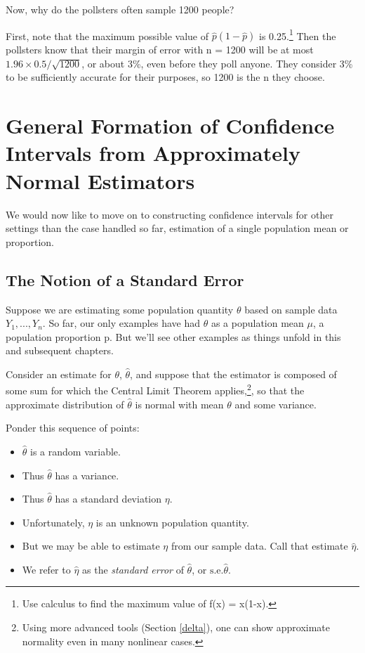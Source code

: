 Now, why do the pollsters often sample 1200 people?  

First, note that the maximum possible value of $\widehat{p}
(1-\widehat{p})$ is 0.25.\footnote{Use calculus to find the maximum
value of f(x) = x(1-x).} Then the pollsters know that their margin of
error with n = 1200 will be at most $1.96 \times 0.5/\sqrt{1200}$, or
about 3\%, even before they poll anyone.  They consider 3\% to be
sufficiently accurate for their purposes, so 1200 is the n they choose.

\section{General Formation of Confidence Intervals from Approximately
Normal Estimators}
\label{stderrest}

We would now like to move on to constructing confidence intervals for
other settings than the case handled so far, estimation of a single
population mean or proportion.

\subsection{The Notion of a Standard Error}
\label{notionofse}

Suppose we are estimating some population quantity $\theta$ based on
sample data $Y_1,...,Y_n$.  So far, our only examples have had $\theta$
as a population mean $\mu$, a population proportion p.  But we'll see
other examples as things unfold in this and subsequent chapters.  

Consider an estimate for $\theta$, $\widehat{\theta}$, and suppose that
the estimator is composed of some sum for which the Central Limit
Theorem applies,\footnote{Using more advanced tools (Section
\ref{delta}), one can show approximate normality even in many nonlinear
cases.}, so that the approximate distribution of  $\widehat{\theta}$ 
is normal with mean $\theta$ and some variance.

Ponder this sequence of points: 

\begin{itemize}

\item $\widehat{\theta}$ is a random variable.

\item Thus $\widehat{\theta}$ has a variance.

\item Thus $\widehat{\theta}$ has a standard deviation $\eta$.

\item Unfortunately, $\eta$ is an unknown population quantity.

\item But we may be able to estimate $\eta$ from our sample data.  Call
that estimate $\widehat{\eta}$.

\item We refer to $\widehat{\eta}$ as the {\it standard error} of
$\widehat{\theta}$, or $\textrm{s.e.}\widehat{\theta}$.

\end{itemize}

